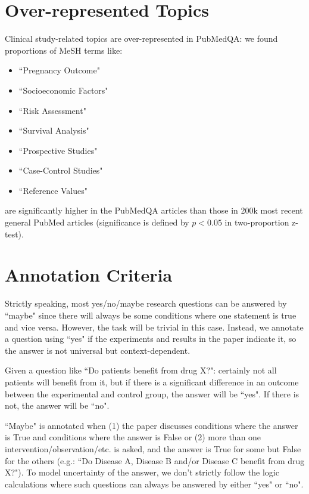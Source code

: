\documentclass[11pt,a4paper]{article}
\begin{document}
\section{Over-represented Topics} \label{appendix:topic}
Clinical study-related topics are over-represented in PubMedQA: we found proportions of MeSH terms like:
\begin{itemize}
    \item ``Pregnancy Outcome"
    \item ``Socioeconomic Factors"
    \item ``Risk Assessment"
    \item ``Survival Analysis"
    \item ``Prospective Studies"
    \item ``Case-Control Studies"
    \item ``Reference Values"
\end{itemize}
are significantly higher in the PubMedQA articles than those in 200k most recent general PubMed articles (significance is defined by $p<0.05$ in two-proportion z-test).

\section{Annotation Criteria}
Strictly speaking, most yes/no/maybe research questions can be answered by ``maybe" since there will always be some conditions where one statement is true and vice versa. However, the task will be trivial in this case. Instead, we annotate a question using ``yes" if the experiments and results in the paper indicate it, so the answer is not universal but context-dependent.

Given a question like ``Do patients benefit from drug X?": certainly not all patients will benefit from it, but if there is a significant difference in an outcome between the experimental and control group, the answer will be ``yes". If there is not, the answer will be ``no".

``Maybe" is annotated when (1) the paper discusses conditions where the answer is True and conditions where the answer is False or (2) more than one intervention/observation/etc. is asked, and the answer is True for some but False for the others (e.g.: ``Do Disease A, Disease B and/or Disease C benefit from drug X?"). To model uncertainty of the answer, we don't strictly follow the logic calculations where such questions can always be answered by either ``yes" or ``no".
\end{document}
